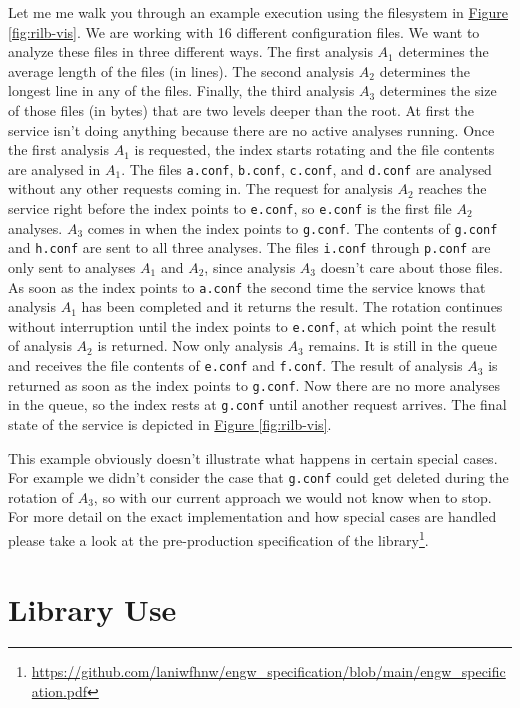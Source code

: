 \documentclass[11pt]{article} %
\newcommand{\hidelinks}[1]{{\hypersetup{hidelinks}#1}}
\newcommand{\figref}[1]{\hidelinks{\hyperref[#1]{Figure \ref{#1}}}}
\begin{document}
  Let me me walk you through an example execution using the filesystem in \figref{fig:rilb-vis}. We are working with 16 different configuration files. We want to analyze these files in three different ways. The first analysis $A_1$ determines the average length of the files (in lines). The second analysis $A_2$ determines the longest line in any of the files. Finally, the third analysis $A_3$ determines the size of those files (in bytes) that are two levels deeper than the root. At first the service isn't doing anything because there are no active analyses running. Once the first analysis $A_1$ is requested, the index starts rotating and the file contents are analysed in $A_1$. The files \texttt{a.conf}, \texttt{b.conf}, \texttt{c.conf}, and \texttt{d.conf} are analysed without any other requests coming in. The request for analysis $A_2$ reaches the service right before the index points to \texttt{e.conf}, so \texttt{e.conf} is the first file $A_2$ analyses. $A_3$ comes in when the index points to \texttt{g.conf}. The contents of \texttt{g.conf} and \texttt{h.conf} are sent to all three analyses. The files \texttt{i.conf} through \texttt{p.conf} are only sent to analyses $A_1$ and $A_2$, since analysis $A_3$ doesn't care about those files. As soon as the index points to \texttt{a.conf} the second time the service knows that analysis $A_1$ has been completed and it returns the result. The rotation continues without interruption until the index points to \texttt{e.conf}, at  which point the result of analysis $A_2$ is returned. Now only analysis $A_3$ remains. It is still in the queue and receives the file contents of \texttt{e.conf} and \texttt{f.conf}. The result of analysis $A_3$ is returned as soon as the index points to \texttt{g.conf}. Now there are no more analyses in the queue, so the index rests at \texttt{g.conf} until another request arrives. The  final state of the service is depicted in \figref{fig:rilb-vis}.

  This example obviously doesn't illustrate what happens in certain special cases. For example we didn't consider the case that \texttt{g.conf} could get deleted during the rotation of $A_3$, so with our current approach we would not know when to stop. For more detail on the exact implementation and how special cases are handled please take a look at the pre-production specification of the library\footnote{\url{https://github.com/laniwfhnw/engw_specification/blob/main/engw_specification.pdf}\label{fn:pp-spec}}.



  \section{Library Use}\label{sec:3}
\end{document}
